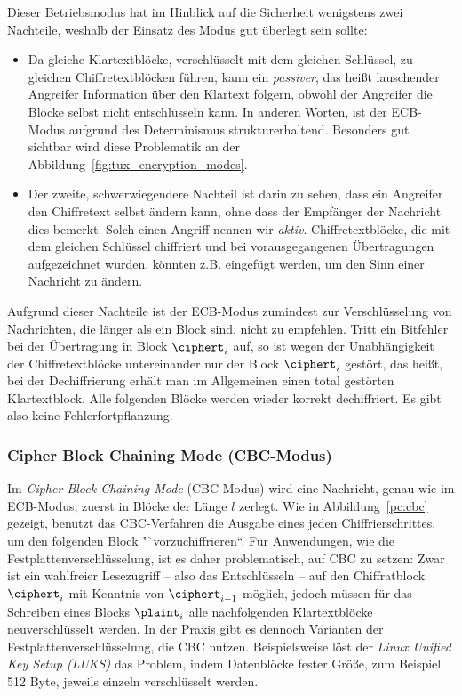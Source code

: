 Dieser Betriebsmodus hat im Hinblick auf die Sicherheit wenigstens zwei Nachteile, weshalb der Einsatz des Modus gut überlegt sein sollte:
\begin{itemize}
	\item Da gleiche Klartextblöcke, verschlüsselt mit dem gleichen Schlüssel, zu gleichen Chiffretextblöcken führen, kann ein \emph{passiver}, das heißt lauschender Angreifer
	Information über den Klartext folgern, obwohl der Angreifer die Blöcke selbst nicht entschlüsseln kann. In anderen Worten, ist der ECB-Modus aufgrund des Determinismus strukturerhaltend. Besonders gut sichtbar wird diese Problematik an der Abbildung~\ref{fig:tux_encryption_modes}.
	\item Der zweite, schwerwiegendere Nachteil ist darin zu sehen, dass ein Angreifer den Chiffretext selbst ändern kann, ohne dass der Empfänger der
	Nachricht dies bemerkt. Solch einen Angriff nennen wir \emph{aktiv}. Chiffretextblöcke, die mit dem gleichen Schlüssel chiffriert und bei vorausgegangenen Übertragungen aufgezeichnet wurden, könnten
	z.B. eingefügt werden, um den Sinn einer Nachricht zu ändern.
\end{itemize}

Aufgrund dieser Nachteile ist der ECB-Modus zumindest zur Verschlüsselung von Nachrichten, die länger als ein Block sind, nicht zu empfehlen.
Tritt ein Bitfehler bei der Übertragung in Block $\ciphert_i$ auf, so ist wegen der Unabhängigkeit der Chiffretextblöcke untereinander nur der Block
$\ciphert_i$ gestört, das heißt, bei der Dechiffrierung erhält man im Allgemeinen einen total gestörten Klartextblock. Alle folgenden Blöcke werden wieder korrekt dechiffriert. Es gibt also keine Fehlerfortpflanzung.

\subsubsection{Cipher Block Chaining Mode (CBC-Modus)}\label{ssec:cbc}
Im \emph{Cipher Block Chaining Mode} (CBC-Modus) wird eine Nachricht, genau wie im ECB-Modus, zuerst in Blöcke der Länge $l$ zerlegt. Wie in Abbildung~\ref{pc:cbc} gezeigt, benutzt das CBC-Verfahren die Ausgabe eines jeden Chiffrierschrittes, um den folgenden Block "`vorzuchiffrieren``.
Für Anwendungen, wie die Festplattenverschlüsselung, ist es daher problematisch, auf CBC zu setzen: Zwar ist ein wahlfreier Lesezugriff -- also das Entschlüsseln -- auf den Chiffratblock $\ciphert_i$ mit Kenntnis von $\ciphert_{i-1}$ möglich, jedoch müssen für das Schreiben eines Blocks $\plaint_i$ alle nachfolgenden Klartextblöcke neuverschlüsselt werden. In der Praxis gibt es dennoch Varianten der Festplattenverschlüsselung, die CBC nutzen.
Beispielsweise löst der \emph{Linux Unified Key Setup (LUKS)} das Problem, indem Datenblöcke fester Größe, zum Beispiel 512 Byte, jeweils einzeln verschlüsselt werden.

